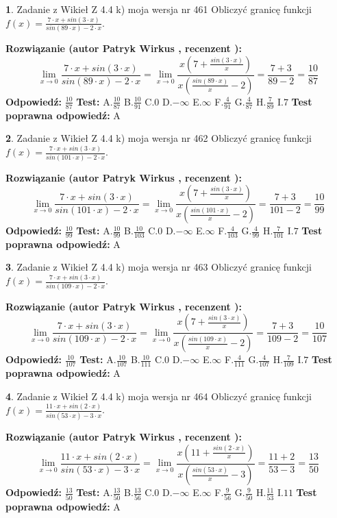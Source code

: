 \documentclass[12pt, a4paper]{article}
\theoremstyle{definition} %
\newtheorem{zad}{}
\newcommand{\zadStart}[1]{\begin{zad}#1\newline}
\newcommand{\zadStop}{\end{zad}}
\newcommand{\rozwStart}[2]{\noindent \textbf{Rozwiązanie (autor #1 , recenzent #2): }\newline}
\newcommand{\rozwStop}{\newline}
\newcommand{\odpStart}{\noindent \textbf{Odpowiedź:}\newline}
\newcommand{\odpStop}{\newline}
\newcommand{\testStart}{\noindent \textbf{Test:}\newline}
\newcommand{\testStop}{\newline}
\newcommand{\kluczStart}{\noindent \textbf{Test poprawna odpowiedź:}\newline}
\newcommand{\kluczStop}{\newline}
\begin{document}
\zadStart{Zadanie z Wikieł Z 4.4 k) moja wersja nr 461}
Obliczyć granicę funkcji $f(x)=\frac{7\cdot x +sin(3\cdot x)}{sin(89\cdot x) -2\cdot x}$.
\zadStop
\rozwStart{Patryk Wirkus}{}
$$\lim\limits_{x\to 0}\frac{7\cdot x +sin(3\cdot x)}{sin(89\cdot x) -2\cdot x}
=\lim\limits_{x\to 0}\frac{x(7+\frac{sin(3\cdot x)}{x})}{x(\frac{sin(89\cdot x)}{x}-2)}
=\frac{7+3}{89-2} = \frac{10}{87}$$
\rozwStop
\odpStart
$\frac{10}{87}$
\odpStop
\testStart
A.$\frac{10}{87}$
B.$\frac{10}{91}$
C.$0$
D.$-\infty$
E.$\infty$
F.$\frac{4}{91}$
G.$\frac{4}{87}$
H.$\frac{7}{89}$
I.$7$
\testStop
\kluczStart
A
\kluczStop



\zadStart{Zadanie z Wikieł Z 4.4 k) moja wersja nr 462}
Obliczyć granicę funkcji $f(x)=\frac{7\cdot x +sin(3\cdot x)}{sin(101\cdot x) -2\cdot x}$.
\zadStop
\rozwStart{Patryk Wirkus}{}
$$\lim\limits_{x\to 0}\frac{7\cdot x +sin(3\cdot x)}{sin(101\cdot x) -2\cdot x}
=\lim\limits_{x\to 0}\frac{x(7+\frac{sin(3\cdot x)}{x})}{x(\frac{sin(101\cdot x)}{x}-2)}
=\frac{7+3}{101-2} = \frac{10}{99}$$
\rozwStop
\odpStart
$\frac{10}{99}$
\odpStop
\testStart
A.$\frac{10}{99}$
B.$\frac{10}{103}$
C.$0$
D.$-\infty$
E.$\infty$
F.$\frac{4}{103}$
G.$\frac{4}{99}$
H.$\frac{7}{101}$
I.$7$
\testStop
\kluczStart
A
\kluczStop



\zadStart{Zadanie z Wikieł Z 4.4 k) moja wersja nr 463}
Obliczyć granicę funkcji $f(x)=\frac{7\cdot x +sin(3\cdot x)}{sin(109\cdot x) -2\cdot x}$.
\zadStop
\rozwStart{Patryk Wirkus}{}
$$\lim\limits_{x\to 0}\frac{7\cdot x +sin(3\cdot x)}{sin(109\cdot x) -2\cdot x}
=\lim\limits_{x\to 0}\frac{x(7+\frac{sin(3\cdot x)}{x})}{x(\frac{sin(109\cdot x)}{x}-2)}
=\frac{7+3}{109-2} = \frac{10}{107}$$
\rozwStop
\odpStart
$\frac{10}{107}$
\odpStop
\testStart
A.$\frac{10}{107}$
B.$\frac{10}{111}$
C.$0$
D.$-\infty$
E.$\infty$
F.$\frac{4}{111}$
G.$\frac{4}{107}$
H.$\frac{7}{109}$
I.$7$
\testStop
\kluczStart
A
\kluczStop



\zadStart{Zadanie z Wikieł Z 4.4 k) moja wersja nr 464}
Obliczyć granicę funkcji $f(x)=\frac{11\cdot x +sin(2\cdot x)}{sin(53\cdot x) -3\cdot x}$.
\zadStop
\rozwStart{Patryk Wirkus}{}
$$\lim\limits_{x\to 0}\frac{11\cdot x +sin(2\cdot x)}{sin(53\cdot x) -3\cdot x}
=\lim\limits_{x\to 0}\frac{x(11+\frac{sin(2\cdot x)}{x})}{x(\frac{sin(53\cdot x)}{x}-3)}
=\frac{11+2}{53-3} = \frac{13}{50}$$
\rozwStop
\odpStart
$\frac{13}{50}$
\odpStop
\testStart
A.$\frac{13}{50}$
B.$\frac{13}{56}$
C.$0$
D.$-\infty$
E.$\infty$
F.$\frac{9}{56}$
G.$\frac{9}{50}$
H.$\frac{11}{53}$
I.$11$
\testStop
\kluczStart
A
\kluczStop
\end{document}
